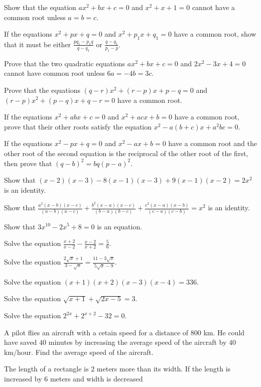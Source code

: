 \item Show that the equation $ax^2 + bx + c = 0$ and $x^2 + x + 1 = 0$ cannot have a common root unless $a = b = c$.
\item If the equations $x^2 + px + q = 0$ and $x^2 + p_1x + q_1 = 0$ have a common root, show that it must be either $\frac{pq_1 -
  p_1q}{q - q_1}$ or $\frac{q - q_1}{p_1 - p}$.
\item Prove that the two quadratic equations $ax^2 + bx + c = 0$ and $2x^2 - 3x + 4 = 0$ cannot have common root unless $6a = -4b =
  3c$.
\item Prove that the equations $(q - r)x^2 + (r - p)x + p - q = 0$ and $(r - p)x^2 + (p - q)x + q - r = 0$ have a common root.
\item If the equations $x^2 + abx + c = 0$ and $x^2 + acx + b = 0$ have a common root, prove that their other roots satisfy the
  equation $x^2 - a(b + c)x + a^2bc = 0$.
\item If the equations $x^2 - px + q = 0$ and $x^2 - ax + b = 0$ have a common root and the other root of the second equation is
  the reciprocal of the other root of the first, then prove that $(q - b)^2 = bq(p - a)^2$.
\item Show that $(x - 2)(x - 3) - 8(x - 1)(x - 3) + 9(x - 1)(x - 2) = 2x^2$ is an identity.
\item Show that $\frac{a^2(x - b)(x - c)}{(a - b)(a - c)} + \frac{b^2(x - a)(x - c)}{(b - a)(b - c)} + \frac{c^2(x - a)(x - b)}{(c
  - a)(c - b)} = x^2$ is an identity.
\item Show that $3x^{10} - 2x^5 + 8 = 0$ is an equation.
\item Solve the equation $\frac{x + 2}{x - 2} - \frac{x - 2}{x + 2} = \frac{5}{6}$.
\item Solve the equation $\frac{2\sqrt{x} + 1}{3 - \sqrt{x}} = \frac{11 - 3\sqrt{x}}{5\sqrt{x} - 9}$.
\item Solve the equation $(x + 1)(x + 2)(x - 3)(x - 4) = 336$.
\item Solve the equation $\sqrt{x + 1} + \sqrt{2x - 5} = 3$.
\item Solve the equation $2^{2x} + 2^{x + 2} - 32 = 0$.
\item A pilot flies an aircraft with a cetain speed for a distance of $800$ km. He could have saved $40$ minutes by increasing the
  average speed of the aircraft by $40$ km/hour. Find the average speed of the aircraft.
\item The length of a rectangle is $2$ meters more than its width. If the length is increased by $6$ meters and width is decreased

